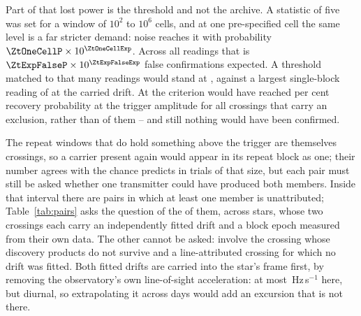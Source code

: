 Part of that lost power is the threshold and not the archive. A statistic
of five was set for a window of $10^{2}$ to $10^{6}$ cells, and at one
pre-specified cell the same level is a far stricter demand: noise reaches it with probability
$\ZtOneCellP\times10^{\ZtOneCellExp}$. Across all \RcNRepeatMeas{} readings
that is $\ZtExpFalseP\times10^{\ZtExpFalseExp}$ false confirmations
expected. A threshold matched to that many
readings would stand at \ZtTrialThr, against a largest single-block reading
of \RcTMatched{} at the carried drift. At \ZtTrialThr{} the criterion would
have reached \RcPowerLevel{} per cent recovery probability at the trigger
amplitude for all \ZtNPowerTrial{} crossings that carry an exclusion, rather
than \RqNPowerHi{} of them -- and still nothing would have been
confirmed.

The \WdNExc{} repeat windows that do hold something above the trigger are
themselves crossings, so a carrier present again would appear in its repeat
block as one; their number agrees with the \WdExpect{} chance predicts in
trials of that size, but each pair must still be asked whether one transmitter
could have produced both members. Inside that interval there are
\TjNCandPair{} pairs in which at least
one member is unattributed; Table~\ref{tab:pairs} asks the question of the
\TjNPair{} of them, across \TjNStarPair{} stars, whose two crossings each
carry an independently fitted drift and a block epoch measured from their own
data. The other \TjNCandLost{} cannot be asked: \TjNCandLostSpec{} involve the
crossing whose discovery products do not survive and \TjNCandLostFit{} a
line-attributed crossing for which no drift was fitted. Both fitted drifts are
carried into the star's frame first, by removing the observatory's own
line-of-sight acceleration: at most \TjFrameMaxHzS\,Hz\,s$^{-1}$ here, but
diurnal, so extrapolating it across days would add an excursion that is not
there.

